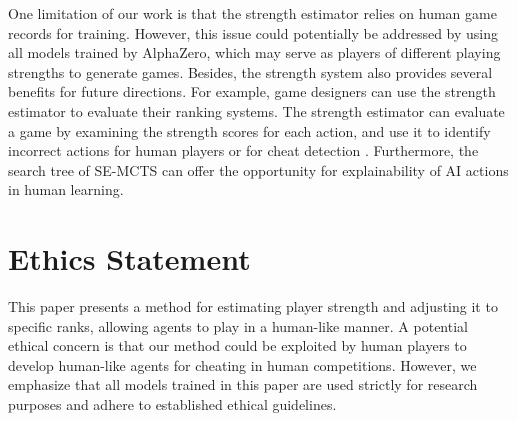 One limitation of our work is that the strength estimator relies on human game records for training.
However, this issue could potentially be addressed by using all models trained by AlphaZero, which may serve as players of different playing strengths to generate games.
Besides, the strength system also provides several benefits for future directions.
For example, game designers can use the strength estimator to evaluate their ranking systems.
The strength estimator can evaluate a game by examining the strength scores for each action, and use it to identify incorrect actions for human players or for cheat detection \citep{alayed_behavioralbased_2013}.
Furthermore, the search tree of SE-MCTS can offer the opportunity for explainability of AI actions in human learning.

\section*{Ethics Statement}
\label{sec:ethics}

This paper presents a method for estimating player strength and adjusting it to specific ranks, allowing agents to play in a human-like manner.
A potential ethical concern is that our method could be exploited by human players to develop human-like agents for cheating in human competitions.
However, we emphasize that all models trained in this paper are used strictly for research purposes and adhere to established ethical guidelines.




